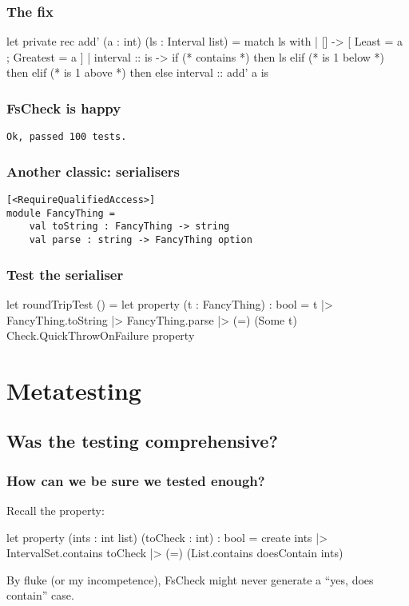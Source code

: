 \documentclass{beamer}
\begin{document}
\begin{frame}[fragile]
\frametitle{The fix}
\begin{fslisting}
let private rec add' (a : int) (ls : Interval list) =
    match ls with
    | [] -> [{ Least = a ; Greatest = a }]
    | interval :: is ->
        if (* contains *) then
            ls
        elif (* is 1 below *) then
        elif (* is 1 above *) then
        else
            interval :: add' a is
\end{fslisting}
\end{frame}

\begin{frame}[fragile]
\frametitle{FsCheck is happy}
\begin{verbatim}
Ok, passed 100 tests.
\end{verbatim}
\end{frame}

\begin{frame}[fragile]
\frametitle{Another classic: serialisers}

\begin{verbatim}
[<RequireQualifiedAccess>]
module FancyThing =
    val toString : FancyThing -> string
    val parse : string -> FancyThing option
\end{verbatim}
\end{frame}

\begin{frame}[fragile]
\frametitle{Test the serialiser}

\begin{fslisting}
[<Test>]
let roundTripTest () =
    let property (t : FancyThing) : bool =
        t
        |> FancyThing.toString
        |> FancyThing.parse
        |> (=) (Some t)
    Check.QuickThrowOnFailure property
\end{fslisting}
\end{frame}

\section{Metatesting}
\tableofcontents

\subsection{Was the testing comprehensive?}

\begin{frame}[fragile]
\frametitle{How can we be sure we tested enough?}

Recall the property:
\begin{fslisting}
let property (ints : int list) (toCheck : int) : bool =
    create ints
    |> IntervalSet.contains toCheck
    |> (=) (List.contains doesContain ints)

\end{fslisting}

By fluke (or my incompetence), FsCheck might never generate a ``yes, does contain'' case.
\end{frame}
\end{document}
